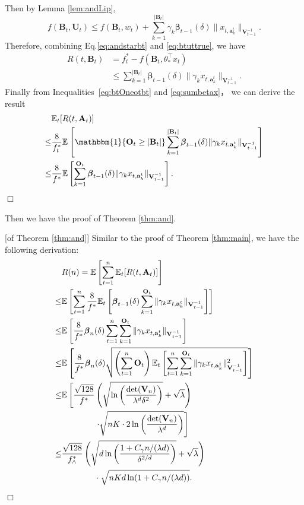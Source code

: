 \documentclass{article}
\newcommand{\bbeta}{\boldsymbol{\beta}}
\newcommand{\EE}{\mathbb{E}}
\newcommand{\bOne}{\mathbbm{1}}
\newcommand{\bA}{\mathbf{A}}
\newcommand{\ba}{\mathbf{a}}
\newcommand{\bB}{\mathbf{B}}
\newcommand{\bO}{\mathbf{O}}
\newcommand{\bU}{\mathbf{U}}
\newcommand{\bV}{\mathbf{V}}
\newcommand{\abs}[1]{\left| #1 \right|}
\newcommand{\norm}[1]{\| #1 \|}
\newenvironment{proof}{\noindent {\textbf{Proof. }}}{$\Box$ \medskip}
\begin{document}
\begin{proof}
	Then by Lemma \ref{lem:andLip},
	\begin{equation} 
		\label{eq:btuttrue}
		f(\bB_t,\bU_t) \leq f(\bB_t, w_t) + \sum_{k=1}^{\abs{\bB_t}}\gamma_k\bbeta_{t-1}(\delta)\norm{x_{t,\ba_k^t}}_{\bV_{t-1}^{-1}}.
	\end{equation}
	Therefore, combining Eq.\eqref{eq:andstarbt} and \eqref{eq:btuttrue}, we have
	\begin{align}
		R(t, \bB_t) & = f_{t}^{\ast} - f(\bB_t, \theta_{\ast}^{\top}x_t) \nonumber \\
		& \leq \sum_{k=1}^{\abs{\bB_t}}\bbeta_{t-1}(\delta)\norm{\gamma_k x_{t,\ba_k^t}}_{\bV_{t-1}^{-1}}. \label{eq:sumbetax}
	\end{align}
	Finally from Inequalities~\eqref{eq:btOneotbt} and \eqref{eq:sumbetax}， we can derive the result
	\begin{align*}
		&\EE_t[R(t, \bA_t)] \\
		\leq& \frac{8}{f_{t}^*} \EE \left[\bOne\{ \bO_t \geq \abs{\bB_t} \}\sum_{k=1}^{\abs{\bB_t}}\bbeta_{t-1}(\delta)\norm{\gamma_k x_{t,\ba_k^t}}_{\bV_{t-1}^{-1}} \right]\\
		\leq& \frac{8}{f^*} \EE \left[ \sum_{k=1}^{ \bO_t } \bbeta_{t-1}(\delta) \norm{\gamma_k x_{t,\ba_k^t}}_{\bV_{t-1}^{-1}} \right].
	\end{align*}
\end{proof}

Then we have the proof of Theorem \ref{thm:and}.

\begin{proof}[of Theorem \ref{thm:and}]
	Similar to the proof of Theorem \ref{thm:main}, we have the following derivation:
	\begin{align}
	&R(n) = \EE \left[ \sum_{t=1}^{n} \EE_{t}[R(t, \bA_t)] \right] \notag\\
	\leq& \EE \left[\sum_{t=1}^{n} \frac{8}{f^{\ast}} \EE_t\left[\bbeta_{t-1}(\delta)\sum_{k=1}^{\bO_t}\norm{\gamma_k x_{t,\ba_k^t}}_{\bV_{t-1}^{-1}} \right] \right] \label{eq:pfMCdeltaEst}\\
	\leq& \EE\left[\frac{8}{f^{\ast}} \bbeta_{n}(\delta) \sum_{t=1}^{n} \sum_{k=1}^{\bO_t}\norm{\gamma_k x_{t,\ba_k^t}}_{\bV_{t-1}^{-1}} \right] \label{eq:pfMCbeta}\\
	\leq& \EE\left[\frac{8}{f^{\ast}} \bbeta_{n}(\delta) \sqrt{ \left(\sum_{t=1}^{n} \bO_t \right) \EE_t \left[\sum_{t=1}^{n} \sum_{k=1}^{\bO_t}\norm{\gamma_k x_{t,\ba_k^t}}_{\bV_{t-1}^{-1}}^2 \right]} \right] \label{eq:pfMCmeaneq}\\
	\leq& \EE \left[\frac{\sqrt{128}}{f^{\ast}} \left(\sqrt{\ln\left(\frac{\det(\bV_n)}{\lambda^d \delta^2}\right) } + \sqrt{\lambda} \right) \right. \notag\\
	&\qquad \qquad \left. \cdot \sqrt{nK \cdot 2\ln \left(\frac{\det(\bV_n)}{\lambda^d} \right)} \right] \label{eq:pfMCsumXi}\\
	\leq& \frac{\sqrt{128}}{f_{\wedge}^{\ast}} \left(\sqrt{d \ln \left( \frac{1 + C_\gamma n/(\lambda d)}{\delta^{2/d}}\right) } + \sqrt{\lambda} \right) \notag\\
	&\qquad \qquad \cdot \sqrt{nKd\ln(1 + C_\gamma n/(\lambda d))}. \label{eq:pfMCdetEst}
	\end{align}
\end{proof}
	
\end{document}
